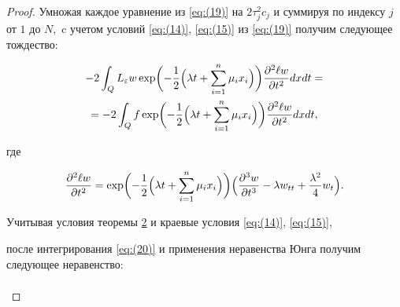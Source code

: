 \begin{proof}
Умножая  каждое уравнение из \eqref{eq:(19)} на $2\tau _{j}^{2}{{c}_{j}}$ и суммируя по индексу  $j$ от $1$ до $N,$ c учетом условий \eqref{eq:(14)}, \eqref{eq:(15)} из \eqref{eq:(19)} получим  следующее тождество:

\begin{multline}

\label{eq:(20)}

-2\int _{Q}{{{L}_{\varepsilon }}}w

\exp \biggl(-

\frac{1}{2} \Bigl(\lambda t+\sum\limits_{i=1}^{n}{{{\mu }_{i}}{{x}_{i}}} \Bigr) \biggr)

\frac{\partial ^2\ell w}{\partial t^2}

dxdt=

\\

=

-2\int _{Q} f  

\exp \biggl(-

\frac{1}{2} \Bigl(\lambda t+\sum\limits_{i=1}^{n}{{{\mu }_{i}}{{x}_{i}}} \Bigr) \biggr)

 \frac{\partial ^2 \ell w}{\partial t^2} dxdt ,

\end{multline} 

где      

$$

\frac{\partial ^2 \ell w}{\partial t^2}=

\exp \biggl(-

\frac{1}{2} \Bigl(\lambda t+\sum\limits_{i=1}^{n}{{{\mu }_{i}}{{x}_{i}}} \Bigr) \biggr)

\Bigl(

\frac{\partial ^3 w}{\partial t^3}- \lambda w_{tt}+\frac{\lambda ^2}{4} w_{t}

\Bigr).

$$





Учитывая условия теоремы \hyperlink{dzh:th2}{2} и  краевые условия \eqref{eq:(14)}, \eqref{eq:(15)},

после интегрирования \eqref{eq:(20)} и применения неравенства Юнга получим следующее  неравенство:


\begin{multline}


\end{multline}
\end{proof}
